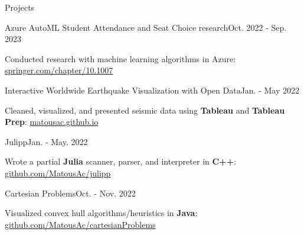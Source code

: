 \begin{rSection}{Projects}
  \begin{project}{Azure AutoML Student Attendance and Seat Choice research}{Oct. 2022 - Sep. 2023}
    \item Conducted research with machine learning algorithms in Azure: \href{https://link.springer.com/chapter/10.1007/978-3-031-47721-8_42}{springer.com/chapter/10.1007}
  \end{project}
  \begin{project}{Interactive Worldwide Earthquake Visualization with Open Data}{Jan. - May 2022}
    \item Cleaned, visualized, and presented seismic data using {\bf Tableau} and {\bf Tableau Prep}: \href{https://matousac.github.io/}{matousac.github.io}
  \end{project}
  \begin{project}{Julipp}{Jan. - May. 2022}
    \item Wrote a partial {\bf Julia} scanner, parser, and interpreter in {\bf C++}: \href{https://github.com/MatousAc/julipp}{github.com/MatousAc/julipp}
  \end{project}
  \begin{project}{Cartesian Problems}{Oct. - Nov. 2022}
    \item Visualized convex hull algorithms/heuristics in {\bf Java}: \href{https://github.com/MatousAc/cartesianProblems}{github.com/MatousAc/cartesianProblems}
  \end{project}
\end{rSection}